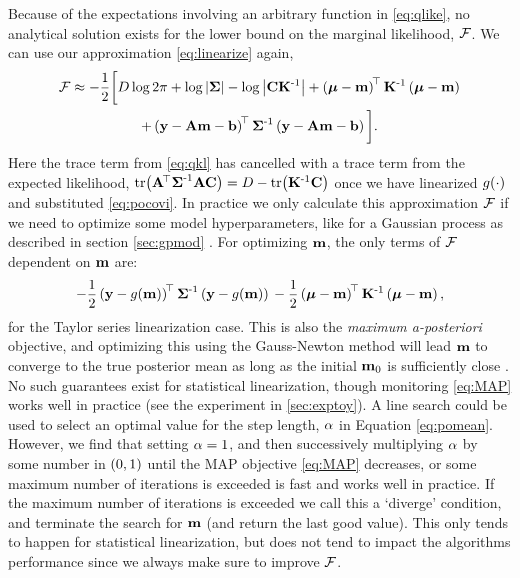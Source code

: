 \documentclass{article} %
\begin{document}
Because of the expectations involving an arbitrary function in
\eqref{eq:qlike}, no analytical solution exists for the lower bound on the
marginal likelihood, $\mathcal{F}$. We can use our approximation
\eqref{eq:linearize} again,
\begin{multline}
    \mathcal{F} \approx - \frac{1}{2} \bigg[
    D\log{2\pi} + \log\left|{\boldsymbol{\Sigma}}\right| - \log\left|{\mathbf{C}\mathbf{K}^{\text{-}1}}\right|
    + \left({\boldsymbol{\mu} - \mathbf{m}}\right)^{\!\top}\mathbf{K}^{\text{-}1}
    \left({\boldsymbol{\mu} - \mathbf{m}}\right) \\
    + \left({\mathbf{y} - \mathbf{A}\mathbf{m} - \mathbf{b}}\right)^{\!\top}\boldsymbol{\Sigma}^{\text{-}1}
        \left({\mathbf{y} - \mathbf{A}\mathbf{m} - \mathbf{b}}\right)
        \bigg].
    \label{eq:approxfengy}
\end{multline}
Here the trace term from \eqref{eq:qkl} has cancelled with a trace term from
the expected likelihood, $\text{tr}\!\left({\mathbf{A}^{\!\top}\boldsymbol{\Sigma}^{\text{-}1}\mathbf{A}\mathbf{C}}\right) = D -
\text{tr}\!\left({\mathbf{K}^{\text{-}1}\mathbf{C}}\right)$ once we have linearized $g\!\left({{\cdot}}\right)$ and
substituted \eqref{eq:pocovi}. In practice we only calculate this approximation
$\mathcal{F}$ if we need to optimize some model hyperparameters, like for a Gaussian
process as described in section \ref{sec:gpmod} . For optimizing $\mathbf{m}$, the
only  terms  of $\mathcal{F}$ dependent on $\mathbf{m}$ are:
\begin{equation}
    -\frac{1}{2} \left({\mathbf{y} - g\!\left({{\mathbf{m}}}\right)}\right)^{\!\top}
            \boldsymbol{\Sigma}^{\text{-}1}
            \left({\mathbf{y} - g\!\left({{\mathbf{m}}}\right)}\right) \\
    -\frac{1}{2}
    \left({\boldsymbol{\mu} - \mathbf{m}}\right)^{\!\top}\mathbf{K}^{\text{-}1}\left({\boldsymbol{\mu} - \mathbf{m}}\right),
    \label{eq:MAP}
\end{equation}
for the Taylor series linearization case. This is also the \emph{maximum
    a-posteriori} objective, and optimizing this using the Gauss-Newton method
will lead $\mathbf{m}$ to converge to the true posterior mean as long as the
initial $\mathbf{m}_0$ is sufficiently close \cite{Nocedal2006}. No such
guarantees exist for statistical linearization, though monitoring
\eqref{eq:MAP} works well in practice (see the experiment in
\autoref{sec:exptoy}). A line search could be used to select an optimal value
for the step length, $\alpha$ in Equation \eqref{eq:pomean}. However, we find
that setting $\alpha=1$, and then successively multiplying $\alpha$ by some
number in $\left({0, 1}\right)$ until the MAP objective \eqref{eq:MAP} decreases, or
some maximum number of iterations is exceeded is fast and works well in
practice. If the maximum number of iterations is exceeded we call this a
`diverge' condition, and terminate the search for $\mathbf{m}$ (and return the
last good value). This only tends to happen for statistical linearization, but
does not tend to impact the algorithms performance since we always make sure to
improve $\mathcal{F}$.
\end{document}
